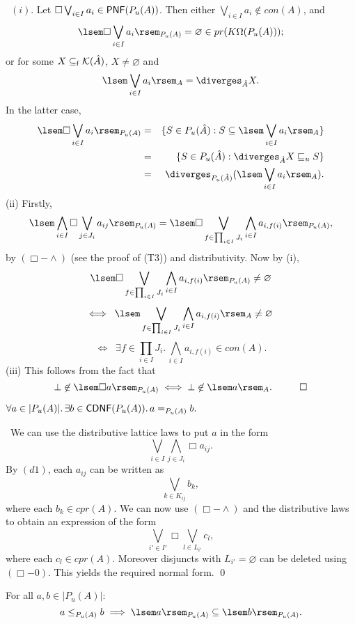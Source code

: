 \proof\ $(i)$. Let $\Box \bigvee_{i \in I}a_{i} \in {\sf PNF}(P_{u}(A))$. Then either $\bigvee_{i \in I}a_{i} \not\in con(A)$, and
\[ \lsem \Box \bigvee_{i \in I}a_{i} \rsem_{P_{u}(A)} = \varnothing \in  pr(K\Omega (P_{u}(A))); \]
or for some $X \subseteq_{\sf f} {\cal K}(\hat{A})$, $X \neq \varnothing$ and
\[ \lsem \bigvee_{i \in I}a_{i} \rsem_{A} = \diverges_{\hat{A}} X. \]
In the latter case,
\begin{eqnarray*}
\lsem \Box \bigvee_{i \in I}a_{i} \rsem_{P_{u}(A)} & = & \{ S \in P_{u}(\hat{A}) : S \subseteq \lsem \bigvee_{i \in I}a_{i} \rsem_{A} \} \\
& = & \{ S \in P_{u}(\hat{A}) : \diverges_{\hat{A}} X \sqsubseteq_{u} S \} \\
& = & \diverges_{P_{u}(\hat{A})}(\lsem \bigvee_{i \in I}a_{i} \rsem_{A}).
\end{eqnarray*} 
(ii) Firstly,
\[ \lsem \bigwedge_{i \in I} \Box \bigvee_{j \in J_{i}} a_{ij}  \rsem_{P_{u}(A)} = \lsem \Box \bigvee_{f \in \prod_{i \in I}J_{i}} \bigwedge_{i \in I}a_{i, f(i)} \rsem_{P_{u}(A)}, \]
by $(\Box - \wedge )$ (see the proof of (T3)) and distributivity. Now by (i),
\[ \lsem \Box \bigvee_{f \in \prod_{i \in I}J_{i}} \bigwedge_{i \in I}a_{i, f(i)} \rsem_{P_{u}(A)} \neq \varnothing \]
\[ \Longleftrightarrow \;\; \lsem \bigvee_{f \in \prod_{i \in I}J_{i}} \bigwedge_{i \in I}a_{i, f(i)} \rsem_{A} \neq \varnothing \]
\[ \Longleftrightarrow \;\; \exists f \in \prod_{i \in I}J_{i}. \, \bigwedge_{i \in I}a_{i, f(i)} \in con(A). \]
(iii) This follows from the fact that
\[ \bot \not\in \lsem \Box a \rsem_{P_{u}(A)} \; \Longleftrightarrow \; \bot \not\in \lsem a \rsem_{A}. \;\;\; \qed \]

\begin{proposition}[T2] 
\label{pdomT2}
$\forall a \in |P_{u}(A)|. \, \exists b \in {\sf CDNF}(P_{u}(A)). \, a =_{P_{u}(A)} b.$
\end{proposition}

\proof\ We can use the distributive lattice laws to put $a$ in the form
\[ \bigvee_{i \in I} \bigwedge_{j \in J_{i}} \Box a_{ij}. \]
By $(d1)$, each $a_{ij}$ can be written as
\[ \bigvee_{k \in K_{ij}}b_{k}, \]
where each $b_{k} \in cpr(A)$. We can now use $(\Box - \wedge )$ and the distributive laws to obtain an expression of the form
\[ \bigvee_{i' \in I'} \Box \bigvee_{l \in L_{i'}} c_{l}, \]
where each $c_{l} \in cpr(A)$. Moreover disjuncts with $L_{i'} = \varnothing$ can be deleted using $(\Box - 0)$. This yields the required normal form. \qed

\begin{proposition}[T3]
For all $a, b \in |P_{u}(A)|$:
\[ a \leq_{P_{u}(A)} b \; \Longrightarrow \; \lsem a \rsem_{P_{u}(A)} \subseteq \lsem b \rsem_{P_{u}(A)}. \]
\end{proposition}

